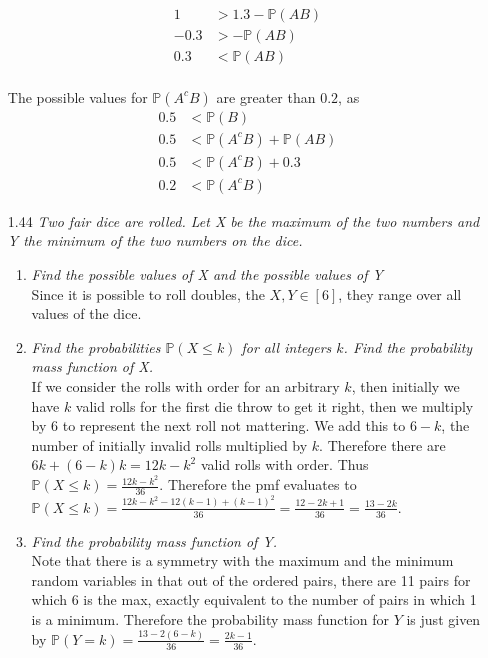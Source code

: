 \documentclass[12pt, letterpaper]{article}
\newcommand{\Pro}{\mathbb{P}}
\begin{document}
\begin{enumerate}
\begin{align*}
		1 &> 1.3 - \Pro(AB)\\
		-0.3 &> -\Pro(AB)\\
		0.3 &< \Pro(AB)
	\end{align*}\\
	The possible values for $\Pro(A^c B)$ are greater than $0.2$, as 
	\begin{align*}
	0.5 &< \Pro(B)\\
	0.5 &< \Pro(A^cB) + \Pro(AB)\\
	0.5 &< \Pro(A^cB) + 0.3\\
	 0.2&<\Pro(A^c B)
	\end{align*}
	\item[1.44]\textit{Two fair dice are rolled. Let X be the maximum of the two
numbers and Y the minimum of the two numbers on the dice.}
	\begin{enumerate}
		\item \textit{Find the possible values of X and the possible values of Y }\\
		Since it is possible to roll doubles, the $X,Y\in[6]$, they range over all values of the dice.  
		\item \textit{Find the probabilities $\Pro(X\leq k)$ for all integers $k$. Find the probability mass function of X.}\\
			If we consider the rolls with order for an  arbitrary $k$, then 
			initially we have $k$ valid rolls for the first die throw to get it right, then we multiply by 6 to represent the next roll not mattering.  We add this to $6-k$, the number of initially invalid rolls multiplied by $k$.  Therefore there are $6k + (6-k)k = 12k - k^2$ valid rolls with order.  
		Thus $\Pro(X \leq k) = \frac{12k-k^2}{36}$.  Therefore the 
		pmf evaluates to $\Pro(X \leq k) = 	\frac{12k -k^2 -12(k-1) +(k-1)^2}{36} = \frac{12 -2k + 1}{36} = \frac{13 - 2k}{36}$.  
		\item \textit{Find the probability mass function of Y.}\\
		Note that there is a symmetry with the maximum and the minimum random variables in that out of the ordered pairs, there are 11 pairs for which $6$ is the max, exactly equivalent to the number of pairs in which 1 is a minimum.  Therefore the probability mass function for $Y$ is just given by $\Pro(Y=k) = \frac{13 - 2(6-k)}{36} = \frac{2k-1}{36}$.  
	\end{enumerate}
\end{enumerate}
\end{document}
